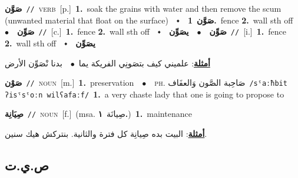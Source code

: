 \documentclass[10pt,a4paper,twoside]{article} %
\begin{document}
\begin{multicols}{2}
{\setlength\topsep{0pt}\textbf{\foreignlanguage{arabic}{صَوَّن}}\ {\color{gray}\texttt{//}\color{black}}\ \textsc{verb}\ [p.]\ \textbf{1.}~soak the grains with water and then remove the scum (unwanted material that float on the surface)\ \ $\smblkdiamond$\ \ \setlength\topsep{0pt}\textbf{\foreignlanguage{arabic}{صَوَّن}}\ \textbf{1.}~fence  \textbf{2.}~wall sth off\ \ $\bullet$\ \ \setlength\topsep{0pt}\textbf{\foreignlanguage{arabic}{صَوِّن}}\ {\color{gray}\texttt{//}\color{black}}\ [c.]\ \textbf{1.}~fence  \textbf{2.}~wall sth off\ \ $\smblkdiamond$\ \ \setlength\topsep{0pt}\textbf{\foreignlanguage{arabic}{صَوِّن}}\ \ $\bullet$\ \ \setlength\topsep{0pt}\textbf{\foreignlanguage{arabic}{يصَوِّن}}\ {\color{gray}\texttt{//}\color{black}}\ [i.]\ \textbf{1.}~fence  \textbf{2.}~wall sth off\ \ $\smblkdiamond$\ \ \setlength\topsep{0pt}\textbf{\foreignlanguage{arabic}{يصَوِّن}}\  \begin{flushright}\color{gray}\foreignlanguage{arabic}{\textbf{\underline{\foreignlanguage{arabic}{أمثلة}}}: علميني كيف بتصَونِي الفريكة يما\ $\bullet$\ \  بدنا نْصَوِّن الأرض}\end{flushright}\color{black}} \vspace{2mm}

{\setlength\topsep{0pt}\textbf{\foreignlanguage{arabic}{صَوْن}}\ {\color{gray}\texttt{//}\color{black}}\ \textsc{noun}\ [m.]\ \textbf{1.}~preservation\ \ $\bullet$\ \ \textsc{ph.} \color{gray} \foreignlanguage{arabic}{صَاحِبة الصَّون وَالعفَاف}\color{black}\ {\color{gray}\texttt{/{\sffamily sˤaːħbit ʔisˤsˤoːn wilʕafaːf}/}\color{black}}\ \textbf{1.}~a very chaste lady that one is going to propose to\ } \vspace{2mm}

{\setlength\topsep{0pt}\textbf{\foreignlanguage{arabic}{صِيَانِة}}\ {\color{gray}\texttt{//}\color{black}}\ \textsc{noun}\ [f.]\ \color{gray}(msa. \foreignlanguage{arabic}{صِيانَة}~\foreignlanguage{arabic}{\textbf{١.}})\color{black}\ \textbf{1.}~maintenance\  \begin{flushright}\color{gray}\foreignlanguage{arabic}{\textbf{\underline{\foreignlanguage{arabic}{أمثلة}}}: البيت بده صِيانِة كل فترة والثانية. بنتركش هيك سنين.}\end{flushright}\color{black}} \vspace{2mm}

\vspace{-3mm}
\subsection*{\color{blue}\foreignlanguage{arabic}{ص.ي.ت}\color{blue}{}} 


\end{multicols}
\end{document}
